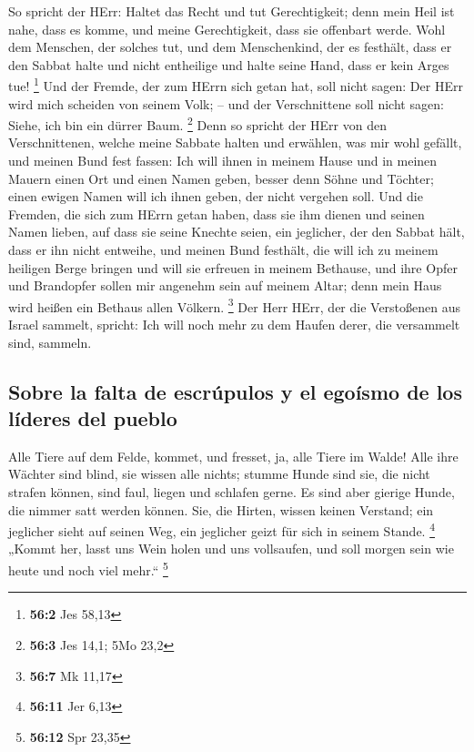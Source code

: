  So spricht der HErr: Haltet das Recht und tut
Gerechtigkeit; denn mein Heil ist nahe, dass es komme, und meine
Gerechtigkeit, dass sie offenbart werde.  Wohl dem
Menschen, der solches tut, und dem Menschenkind, der es festhält, dass
er den Sabbat halte und nicht entheilige und halte seine Hand, dass er
kein Arges tue! \footnote{\textbf{56:2} Jes 58,13}  Und
der Fremde, der zum HErrn sich getan hat, soll nicht sagen: Der HErr
wird mich scheiden von seinem Volk; -- und der Verschnittene soll nicht
sagen: Siehe, ich bin ein dürrer Baum. \footnote{\textbf{56:3} Jes 14,1;
  5Mo 23,2}  Denn so spricht der HErr von den
Verschnittenen, welche meine Sabbate halten und erwählen, was mir wohl
gefällt, und meinen Bund fest fassen:  Ich will ihnen in
meinem Hause und in meinen Mauern einen Ort und einen Namen geben,
besser denn Söhne und Töchter; einen ewigen Namen will ich ihnen geben,
der nicht vergehen soll.  Und die Fremden, die sich zum
HErrn getan haben, dass sie ihm dienen und seinen Namen lieben, auf dass
sie seine Knechte seien, ein jeglicher, der den Sabbat hält, dass er ihn
nicht entweihe, und meinen Bund festhält,  die will ich zu
meinem heiligen Berge bringen und will sie erfreuen in meinem Bethause,
und ihre Opfer und Brandopfer sollen mir angenehm sein auf meinem Altar;
denn mein Haus wird heißen ein Bethaus allen Völkern. \footnote{\textbf{56:7}
  Mk 11,17}  Der Herr HErr, der die Verstoßenen aus Israel
sammelt, spricht: Ich will noch mehr zu dem Haufen derer, die versammelt
sind, sammeln.

\hypertarget{sobre-la-falta-de-escruxfapulos-y-el-egouxedsmo-de-los-luxedderes-del-pueblo}{%
\subsection{Sobre la falta de escrúpulos y el egoísmo de los líderes del
pueblo}\label{sobre-la-falta-de-escruxfapulos-y-el-egouxedsmo-de-los-luxedderes-del-pueblo}}

 Alle Tiere auf dem Felde, kommet, und fresset, ja, alle
Tiere im Walde!  Alle ihre Wächter sind blind, sie wissen
alle nichts; stumme Hunde sind sie, die nicht strafen können, sind faul,
liegen und schlafen gerne.  Es sind aber gierige Hunde,
die nimmer satt werden können. Sie, die Hirten, wissen keinen Verstand;
ein jeglicher sieht auf seinen Weg, ein jeglicher geizt für sich in
seinem Stande. \footnote{\textbf{56:11} Jer 6,13}  „Kommt
her, lasst uns Wein holen und uns vollsaufen, und soll morgen sein wie
heute und noch viel mehr.`` \footnote{\textbf{56:12} Spr 23,35}

